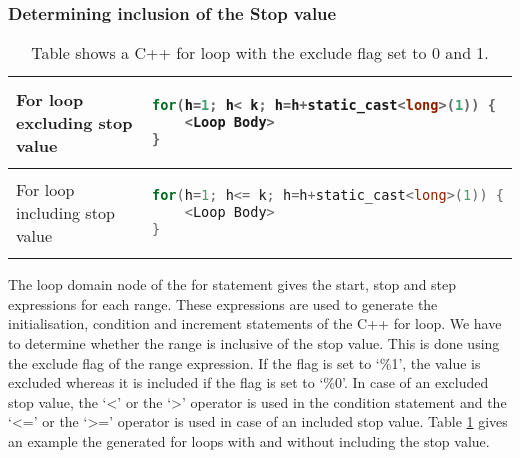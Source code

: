 \subsubsection{Determining inclusion of the Stop value}
\begin{table}[htbp]
\begin{tabular}{|l|l|}
\hline

For loop excluding stop value & 
{
\begin{lstlisting}[language=c,frame=none, numbers=none]
for(h=1; h< k; h=h+static_cast<long>(1)) {
	<Loop Body>
}
\end{lstlisting}
}
 \\
\hline 

For loop including stop value & 
{
\begin{lstlisting}[language=c,frame=none, numbers=none]
for(h=1; h<= k; h=h+static_cast<long>(1)) {
	<Loop Body>
}
\end{lstlisting}
} \\
\hline
\end{tabular}
\caption[Use of exclude flag in For statement]{Table shows a C++ for loop with the exclude flag set to 0 and 1.}
\label{tab:excludeFor}
\end{table}
The loop domain node of the for statement gives the start, stop and step expressions for each range. These expressions are used to generate the initialisation, condition and increment statements of the C++ for loop. We have to determine whether the range is  inclusive of the stop value.  This is done using the exclude flag of the range expression. If the flag is set to `\%1', the value is excluded whereas it is included if the flag is set to `\%0'. In case of an excluded stop value, the `<' or the `>' operator is used in the condition statement and the `<=' or the `>=' operator is used in case of an included stop value. Table \ref{tab:excludeFor} gives an example the generated for loops with and without including the stop value.

